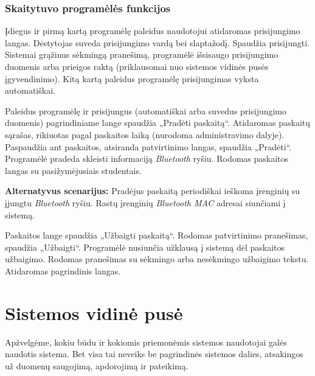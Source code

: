 \documentclass{VUMIFPSkursinis}
\begin{document}
\subsubsection{Skaitytuvo programėlės funkcijos}


Įdiegus ir pirmą kartą programėlę paleidus naudotojui atidaromas prisijungimo langas. Dėstytojas suveda prisijungimo vardą bei slaptažodį. Spaudžia prisijungti. Sistemai grąžinus sėkmingą pranešimą, programėlė išsisaugo prisijungimo duomenis arba prieigos raktą (priklausomai nuo sistemos vidinės pusės įgyvendinimo). Kitą kartą paleidus programėlę prisijungimas vyksta automatiškai.


Paleidus programėlę ir prisijungus (automatiškai arba suvedus prisijungimo duomenis) pagrindiniame lange spaudžia „Pradėti paskaitą“. Atidaromas paskaitų sąrašas, rikiuotas pagal paskaitos laiką (nurodoma administravimo dalyje). Paspaudžia ant paskaitos, atsiranda patvirtinimo langas, spaudžia „Pradėti“. Programėlė pradeda skleisti informaciją \textit{Bluetooth} ryšiu. Rodomas paskaitos langas su pasižymėjusiais studentais.

\textbf{Alternatyvus scenarijus:} Pradėjus paskaitą periodiškai ieškoma įrenginių su įjungtu \textit{Bluetooth} ryšiu. Rastų įrenginių \textit{Bluetooth MAC} adresai siunčiami į sistemą.


Paskaitos lange spaudžia „Užbaigti paskaitą“. Rodomas patvirtinimo pranešimas, spaudžia „Užbaigti“. Programėlė nusiunčia užklausą į sistemą dėl paskaitos užbaigimo. Rodomas pranešimas su sėkmingo arba nesėkmingo užbaigimo tekstu. Atidaromas pagrindinis langas.

\section{Sistemos vidinė pusė}

Apžvelgėme, kokiu būdu ir kokiomis priemonėmis sistemos naudotojai galės naudotis sistema. Bet visa tai neveiks be pagrindinės sistemos dalies, atsakingos už duomenų saugojimą, apdorojimą ir pateikimą.
\end{document}
